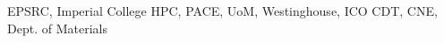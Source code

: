 \cleardoublepage


\begin{acknowledgements}

EPSRC, Imperial College HPC, PACE, UoM, Westinghouse, ICO CDT, CNE, Dept. of Materials

\end{acknowledgements}